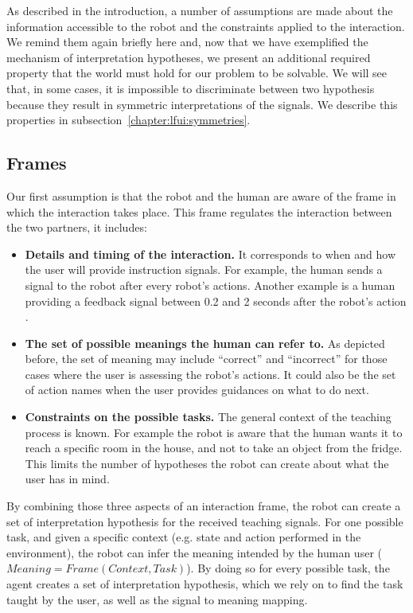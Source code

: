 As described in the introduction, a number of assumptions are made about the information accessible to the robot and the constraints applied to the interaction. We remind them again briefly here and, now that we have exemplified the mechanism of interpretation hypotheses, we present an additional required property that the world must hold for our problem to be solvable. We will see that, in some cases, it is impossible to discriminate between two hypothesis because they result in symmetric interpretations of the signals. We describe this properties in subsection~\ref{chapter:lfui:symmetries}.

\subsection{Frames}

Our first assumption is that the robot and the human are aware of the frame in which the interaction takes place. This frame regulates the interaction between the two partners, it includes:

\begin{itemize}

\item \textbf{Details and timing of the interaction.} It corresponds to when and how the user will provide instruction signals. For example, the human sends a signal to the robot after every robot's actions. Another example is a human providing a feedback signal between 0.2 and 2 seconds after the robot's action \cite{knox2009interactively}.

\item \textbf{The set of possible meanings the human can refer to.} As depicted before, the set of meaning may include ``correct'' and ``incorrect'' for those cases where the user is assessing the robot's actions. It could also be the set of action names when the user provides guidances on what to do next.

\item \textbf{Constraints on the possible tasks.} The general context of the teaching process is known. For example the robot is aware that the human wants it to reach a specific room in the house, and not to take an object from the fridge. This limits the number of hypotheses the robot can create about what the user has in mind.

\end{itemize}

By combining those three aspects of an interaction frame, the robot can create a set of interpretation hypothesis for the received teaching signals. For one possible task, and given a specific context (e.g. state and action performed in the environment), the robot can infer the meaning intended by the human user ($Meaning = Frame(Context, Task)$). By doing so for every possible task, the agent creates a set of interpretation hypothesis, which we rely on to find the task taught by the user, as well as the signal to meaning mapping.

